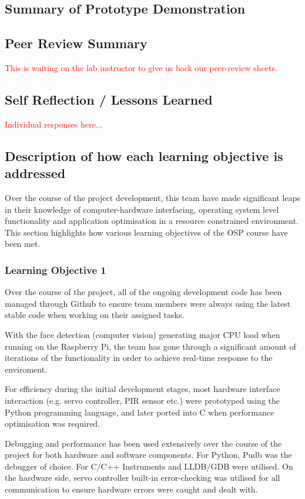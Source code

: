 \documentclass[11pt,a4paper,titlepage]{report}
\begin{document}
\subsection{Summary of Prototype Demonstration}
\subsection{Peer Review Summary}

\textcolor{red}{This is waiting on the lab instructor to give us back our peer-review sheets.}


\subsection{Self Reflection / Lessons Learned}

\textcolor{red}{Individual responses here...}


\subsection{Description of how each learning objective is addressed}


Over the course of the project development, this team have made significant leaps in their knowledge of computer-hardware interfacing, operating system level functionality and application optimisation in a resource constrained environment. This section highlights how various learning objectives of the OSP course have been met.
 
\subsubsection{Learning Objective 1}
Over the course of the project, all of the ongoing development code has been managed through Github to ensure team members were always using the latest stable code when working on their assigned tasks.

With the face detection (computer vision) generating major CPU load when running on the Raspberry Pi, the team has gone through a significant amount of iterations of the functionality in order to achieve real-time response to the enviroment.


For efficiency during the initial development stages, most hardware interface interaction (e.g. servo controller, PIR sensor etc.) were prototyped using the Python programming language, and later ported into C when performance optimisation was required.


Debugging and performance has been used extensively over the course of the project for both hardware and software components. For Python, Pudb was the debugger of choice. For C/C++ Instruments and LLDB/GDB were utilised. On the hardware side, servo controller built-in error-checking was utilised for all communication to ensure hardware errors were caught and dealt with.
 
\end{document}
